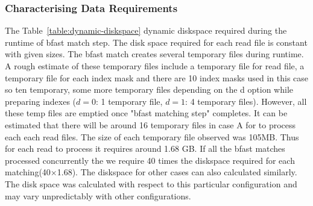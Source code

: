 \documentclass{acm_proc_article-sp}
\begin{document}
 
\subsubsection{Characterising Data Requirements}

The Table~\ref{table:dynamic-diskspace} dynamic diskspace required
during the runtime of bfast match step.  The disk space required for
each read file is constant with given sizes. The bfast match creates
several temporary files during runtime. A rough estimate of these
temporary files include a temporary file for read file, a temporary
file for each index mask and there are 10 index masks used in this
case so ten temporary, some more temporary files depending on the d
option while preparing indexes ($d=0$: 1 temporary file, $d=1$: 4
temporary files).  However, all these temp files are emptied once
"bfast matching step" completes.  It can be estimated that there will
be around 16 temporary files in case A for to process each each read
files. The size of each temporary file observed was 105MB. Thus for
each read to process it requires around 1.68 GB. If all the bfast
matches processed concurrently the we require 40 times the diskspace
required for each matching(40$\times$1.68).  The diskspace for other cases
can also calculated similarly. The disk space was calculated with
respect to this particular configuration and may vary unpredictably
with other configurations.
\end{document}
